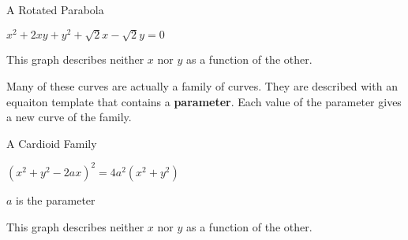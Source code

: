 \documentclass{ximera}
\begin{document}
\begin{example} A Rotated Parabola


$x^2 + 2 x y + y^2 + \sqrt{2} x - \sqrt{2} y = 0$







\begin{center}
\end{center}











This graph describes neither $x$ nor $y$ as a function of the other.



\end{example}













Many of these curves are actually a family of curves.  They are described with an equaiton template that contains a \textbf{parameter}. Each value of the parameter gives a new curve of the family.


\begin{example} A Cardioid Family


$(x^2 + y^2 - 2 a x)^2 = 4 a^2 (x^2 +y^2)$

$a$ is the parameter





\begin{center}
\end{center}











This graph describes neither $x$ nor $y$ as a function of the other.



\end{example}
\end{document}
